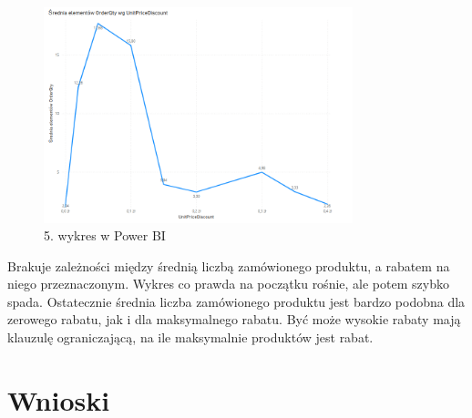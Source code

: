 \documentclass[a4paper,12pt]{article}
\begin{document}
\begin{figure}[H]
    \centering
    \includegraphics[width=0.8\textwidth]{images/power_bi/05.png}
    \caption{5. wykres w Power BI}
\end{figure}

Brakuje zależności między średnią liczbą zamówionego produktu, a rabatem na niego przeznaczonym. Wykres co prawda na początku rośnie, ale potem szybko spada. Ostatecznie średnia liczba zamówionego produktu jest bardzo podobna dla zerowego rabatu, jak i dla maksymalnego rabatu. Być może wysokie rabaty mają klauzulę ograniczającą, na ile maksymalnie produktów jest rabat.

\section{Wnioski}

\printbibliography
\end{document}
